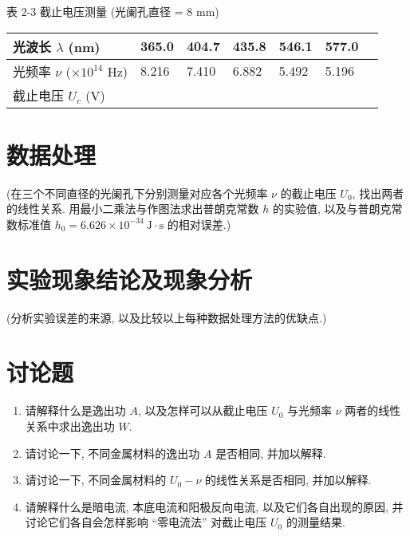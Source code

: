 \documentclass[signature=preparation]{physicsreport}
\begin{document}
{\small\selectfont \centering 表 2-3 截止电压测量 (光阑孔直径 = 8 mm) \par}
\begin{table*}[ht]
    \renewcommand{\arraystretch}{1.4}
    \small\selectfont
    \centering
    \begin{tabularx}{\textwidth}{|l|Y|Y|Y|Y|Y|Y|} \hline
        光波长 $\lambda$ (nm)              & 365.0 & 404.7 & 435.8 & 546.1 & 577.0 \\\hline
        光频率 $\nu$ ($\times 10^{14}$ Hz) & 8.216 & 7.410 & 6.882 & 5.492 & 5.196 \\\hline
        截止电压 $U_c$ (V)                  &       &       &       &       &       \\\hline
    \end{tabularx}
\end{table*}

\normalsize\selectfont

\makeatletter
{}
\makeatother

\newpage
\section{数据处理}
 (在三个不同直径的光阑孔下分别测量对应各个光频率 $\nu$ 的截止电压 $U_0$, 找出两者的线性关系. 用最小二乘法与作图法求出普朗克常数 $h$ 的实验值, 以及与普朗克常数标准值 $h_0=6.626\times 10^{-34}\ \mathrm{J\cdot s}$ 的相对误差.)

\newpage
\section{实验现象结论及现象分析}
 (分析实验误差的来源, 以及比较以上每种数据处理方法的优缺点.)

\newpage
\section{讨论题}
\begin{enumerate}
    \item 请解释什么是逸出功 $A$, 以及怎样可以从截止电压 $U_0$ 与光频率 $\nu$ 两者的线性关系中求出逸出功 $W$.
    \item 请讨论一下, 不同金属材料的逸出功 $A$ 是否相同, 并加以解释.
    \item 请讨论一下, 不同金属材料的 $U_0-\nu$ 的线性关系是否相同, 并加以解释.
    \item 请解释什么是暗电流, 本底电流和阳极反向电流, 以及它们各自出现的原因, 并讨论它们各自会怎样影响 ``零电流法'' 对截止电压 $U_0$ 的测量结果.
\end{enumerate}
\end{document}
